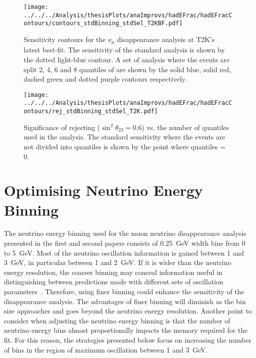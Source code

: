 \begin{figure}
  \centering
\texttt{[image: ../../../Analysis/thesisPlots/anaImprovs/hadEFrac/hadEFracContours/contours\_stdBinning\_stdSel\_T2KBF.pdf]}
  \caption{Sensitivity contours for the $\nu_\mu$ disappearance analysis at
    T2K's latest best-fit. The sensitivity of the standard
    analysis is shown by the dotted light-blue contour. A set of analysis
    where the events are split 2, 4, 6 and 8 quantiles of \hadefrac{}
    are shown by the solid blue, solid red, dashed green and dotted 
    purple contours respectively.} 
  \label{fig:hadEFracContour_T2K}
\end{figure}

\begin{figure}
  \centering
  \texttt{[image: ../../../Analysis/thesisPlots/anaImprovs/hadEFrac/hadEFracContours/rej\_stdBinning\_stdSel\_T2K.pdf]}
  \caption{Significance of rejecting ($\sin^2\theta_{23} = 0.6$)
    vs. the number of \hadefrac{} quantiles used in the
    analysis. 
    The standard sensitivity where the events are not
    divided into quantiles is shown by the point where quantiles = 0.    
  } 
  \label{fig:hadEFracRej_T2K}
\end{figure}




\section{Optimising Neutrino Energy Binning} \label{sec:EnergyBinning}

The neutrino energy binning used for the muon neutrino
disappearance analysis presented in the first and second papers
consists of 0.25~GeV width bins from 0 to 5~GeV. 
Most of the neutrino oscillation information is gained between 1 and
3~GeV, in particular between 1 and 2~GeV. 
If it is wider than the neutrino energy resolution, the coarser
binning may conceal information useful in distinguishing 
between predictions made with different sets of oscillation
parameters~\cite{Marshall}. 
Therefore, using finer binning could enhance the sensitivity of the
disappearance analysis.  
The advantages of finer binning will diminish as the bin size
approaches and goes beyond the neutrino energy resolution.
Another point to consider when adjusting the neutrino energy binning
is that the number of neutrino energy bins almost
proportionally impacts the memory required for the fit. 
For this reason, the strategies presented below focus on increasing
the number of bins in the region of maximum oscillation between 1 and
3~GeV.

